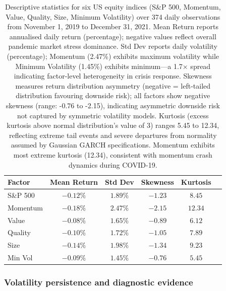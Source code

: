 \documentclass{article}
\begin{document}
\begin{table}[htbp]
\centering
\caption{Descriptive statistics for six US equity indices (S\&P 500, Momentum, Value, Quality, Size, Minimum Volatility) over 374 daily observations from November 1, 2019 to December 31, 2021. Mean Return reports annualised daily return (percentage); negative values reflect overall pandemic market stress dominance. Std Dev reports daily volatility (percentage); Momentum (2.47\%) exhibits maximum volatility while Minimum Volatility (1.45\%) exhibits minimum—a 1.7× spread indicating factor-level heterogeneity in crisis response. Skewness measures return distribution asymmetry (negative = left-tailed distribution favouring downside risk); all factors show negative skewness (range: -0.76 to -2.15), indicating asymmetric downside risk not captured by symmetric volatility models. Kurtosis (excess kurtosis above normal distribution’s value of 3) ranges 5.45 to 12.34, reflecting extreme tail events and severe departures from normality assumed by Gaussian GARCH specifications. Momentum exhibits most extreme kurtosis (12.34), consistent with momentum crash dynamics during COVID-19.}
\label{tab:descriptive_statistics}
\begin{tabular}{lccccc}
\toprule
\textbf{Factor} & \textbf{Mean Return} & \textbf{Std Dev} & \textbf{Skewness} & \textbf{Kurtosis}\\
\midrule
S\&P 500   & $-0.12\%$ & $1.89\%$ & $-1.23$ & $8.45$ \\
Momentum   & $-0.18\%$ & $2.47\%$ & $-2.15$ & $12.34$ \\
Value      & $-0.08\%$ & $1.65\%$ & $-0.89$ & $6.12$ \\
Quality    & $-0.10\%$ & $1.72\%$ & $-1.05$ & $7.89$ \\
Size       & $-0.14\%$ & $1.98\%$ & $-1.34$ & $9.23$ \\
Min Vol    & $-0.09\%$ & $1.45\%$ & $-0.76$ & $5.45$ \\
\bottomrule
\end{tabular}
\end{table}


\subsubsection{Volatility persistence and diagnostic evidence}
\end{document}
